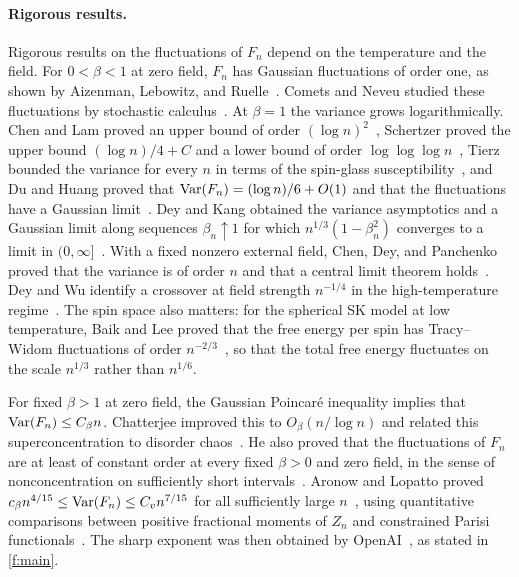 \paragraph{Rigorous results.}
Rigorous results on the fluctuations of $F_n$ depend on the temperature and
the field. For $0<\beta<1$ at zero field, $F_n$ has Gaussian fluctuations of
order one, as shown by Aizenman, Lebowitz, and Ruelle~\cite{alr-1987}. Comets
and Neveu studied these fluctuations by stochastic
calculus~\cite{comets-neveu-1995}. At $\beta=1$ the variance grows
logarithmically. Chen and Lam proved an upper bound of order
$(\log n)^2$~\cite[Theorem~1.1]{chen-lam-2019}, Schertzer proved the upper
bound $(\log n)/4+C$ and a lower bound of order
$\log\log\log n$~\cite[Theorems~1 and~2]{schertzer-2026}, Tierz bounded the
variance for every $n$ in terms of the spin-glass
susceptibility~\cite[Theorem~1.2]{tierz-critical-2026}, and Du and Huang
proved that $\operatorname{Var}(F_n)=(\log n)/6+O(1)$ and that the fluctuations have a
Gaussian limit~\cite[Theorem~1.3]{du-huang-2026}. Dey and Kang obtained the
variance asymptotics and a Gaussian limit along sequences $\beta_n\uparrow1$
for which $n^{1/3}(1-\beta_n^2)$ converges to a limit in
$(0,\infty]$~\cite[Theorem~1.1]{dey-kang-2026}. With a fixed nonzero external field,
Chen, Dey, and Panchenko proved that the variance is of order $n$ and that a
central limit theorem
holds~\cite[Theorems~1 and~2]{chen-dey-panchenko-2017}. Dey and Wu identify
a crossover at field strength $n^{-1/4}$ in the high-temperature
regime~\cite[Theorem~1.3]{dey-wu-2023}. The spin space also
matters: for the spherical SK model at low temperature, Baik and Lee proved
that the free energy per spin has Tracy--Widom fluctuations of order
$n^{-2/3}$~\cite[Theorems~2.10 and~2.11]{baik-lee-2016}, so that the total
free energy fluctuates on the scale $n^{1/3}$ rather than $n^{1/6}$.

For fixed $\beta>1$ at zero field, the Gaussian Poincar\'e inequality implies
that $\operatorname{Var}(F_n)\le C_\beta n$. Chatterjee improved this to $O_\beta(n/\log n)$ and
related this superconcentration to disorder
chaos~\cite[Theorem~1.5]{chatterjee-2009}. He also proved that the fluctuations
of $F_n$ are at least of constant order at every fixed $\beta>0$ and zero
field, in the sense of nonconcentration on sufficiently short
intervals~\cite[Theorem~2.4]{chatterjee-lower-2019}. Aronow and Lopatto proved
$c_\beta n^{4/15}\le\operatorname{Var}(F_n)\le C_v n^{7/15}$ for all sufficiently large
$n$~\cite[Theorem~1.4]{quantitative-parisi}, using quantitative comparisons
between positive fractional moments of $Z_n$ and constrained Parisi
functionals~\cite[Theorem~1.1]{quantitative-parisi}. The sharp exponent was
then obtained by OpenAI~\cite[Theorem~1.1]{oai-fluctuations}, as stated in
\cref{f:main}.

